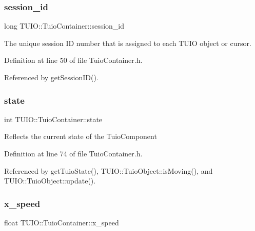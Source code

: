\subsubsection{\texorpdfstring{session\+\_\+id}{session\_id}}
{\footnotesize\ttfamily long T\+U\+I\+O\+::\+Tuio\+Container\+::session\+\_\+id\hspace{0.3cm}{\ttfamily [protected]}}

The unique session ID number that is assigned to each T\+U\+IO object or cursor. 

Definition at line 50 of file Tuio\+Container.\+h.



Referenced by get\+Session\+I\+D().

\mbox{\label{class_t_u_i_o_1_1_tuio_container_a61cfc66997d3d2f2a503e20bd29ddbf1}} 
\subsubsection{\texorpdfstring{state}{state}}
{\footnotesize\ttfamily int T\+U\+I\+O\+::\+Tuio\+Container\+::state\hspace{0.3cm}{\ttfamily [protected]}}

Reflects the current state of the Tuio\+Component 

Definition at line 74 of file Tuio\+Container.\+h.



Referenced by get\+Tuio\+State(), T\+U\+I\+O\+::\+Tuio\+Object\+::is\+Moving(), and T\+U\+I\+O\+::\+Tuio\+Object\+::update().

\mbox{\label{class_t_u_i_o_1_1_tuio_container_a5ee28d0495d5cc4fa331ed0b14b9e176}} 
\subsubsection{\texorpdfstring{x\+\_\+speed}{x\_speed}}
{\footnotesize\ttfamily float T\+U\+I\+O\+::\+Tuio\+Container\+::x\+\_\+speed\hspace{0.3cm}{\ttfamily [protected]}}

